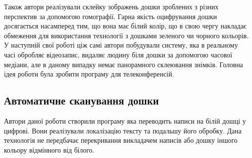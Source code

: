 Також автори реалізували склейку зображень дошки зроблених з різних
перспектив за допомогою гомографії. Гарна якість оцифрування дошки
досягається насамперед тим, що вона має білий колір, що в свою чергу
накладає обмеження для використання технології з дошками зеленого чи
чорного кольорів.
У наступній свої роботі \cite{zhang:2007} ціж самі автори побудували
систему, яка в реальному часі обробляє відеозапис, видаляє людину біля 
дошки за допомогою часової медіани, але в даному випадку немає 
панорамного склеювання знімків. Головна ідея роботи була зробити 
програму для телеконференсій.

\subsection{Автоматичне сканування дошки}

Автори даної роботи \cite{wienecke} створили програму яка переводить написи на білій 
дошці у цифрові. Вони реалізували локалізацію тексту та подальшу 
його обробку. Дана технологія не передбачає перекривання викладачем написів
або дошку іншого кольору відмінного від білого.

